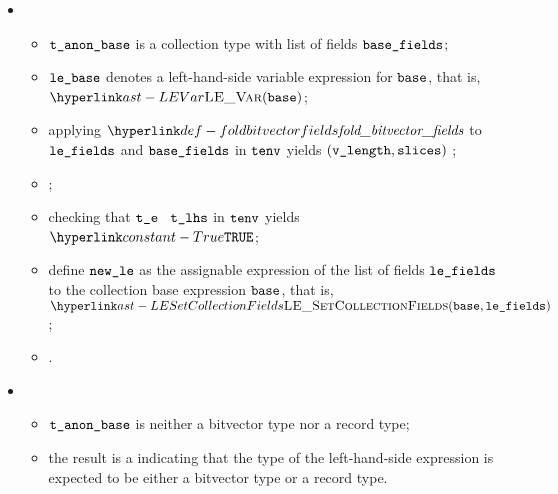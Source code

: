 \begin{itemize}
\begin{itemize}
    \item {}
    \begin{itemize}
      \item $\texttt{t\_anon\_base}$ is a collection type with list of fields
        $\texttt{base\_fields}$;
      \item $\texttt{le\_base}$ denotes a left-hand-side variable expression for
        $\texttt{base}$, that is, $\LEVar(\vbase)$;
      \item applying $\foldbitvectorfields$ to $\texttt{le\_fields}$ and $\texttt{base\_fields}$
        in $\texttt{tenv}$ yields $(\texttt{v\_length}, \texttt{slices})$ \ProseOrTypeError;
      \item {};
      \item checking that $\texttt{t\_e}$ \typesatisfiesterm\ $\texttt{t\_lhs}$ in $\texttt{tenv}$ yields
        $\True$\ProseOrTypeError;
      \item define $\texttt{new\_le}$ as the assignable expression of the list of fields
        $\texttt{le\_fields}$ to the collection base expression $\texttt{base}$, that is, \\
        $\LESetCollectionFields(\vbase, \vlefields)$;
      \item \Proseeqdef{$\vses$}{$\vsesbase$}.
    \end{itemize}

    \item {}
    \begin{itemize}
      \item $\texttt{t\_anon\_base}$ is neither a bitvector type nor a record type;
      \item the result is a \typingerrorterm{} indicating that the type of the left-hand-side expression is expected to be
            either a bitvector type or a record type.
    \end{itemize}
  \end{itemize}
\end{itemize}

